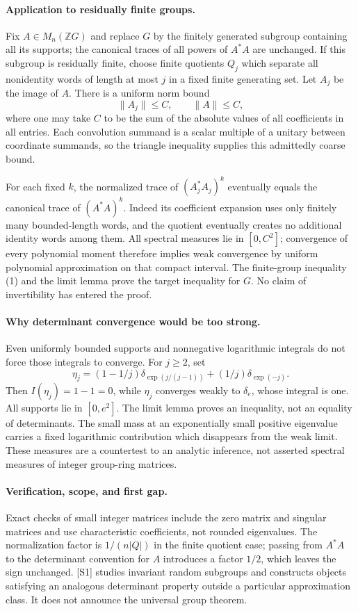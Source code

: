 \documentclass[11pt]{article}
\begin{document}
\paragraph{Application to residually finite groups.}
Fix $A\in M_n(\mathbb ZG)$ and replace $G$ by the finitely generated
subgroup containing all its supports; the canonical traces of all
powers of $A^*A$ are unchanged. If this subgroup is residually finite,
choose finite quotients $Q_j$ which separate all nonidentity words of
length at most $j$ in a fixed finite generating set. Let $A_j$ be the
image of $A$. There is a uniform norm bound
\[
 \|A_j\|\le C,\qquad\|A\|\le C,
\]
where one may take $C$ to be the sum of the absolute values of all
coefficients in all entries. Each convolution summand is a scalar
multiple of a unitary between coordinate summands, so the triangle
inequality supplies this admittedly coarse bound.

For each fixed $k$, the normalized trace of $(A_j^*A_j)^k$ eventually
equals the canonical trace of $(A^*A)^k$. Indeed its coefficient
expansion uses only finitely many bounded-length words, and the
quotient eventually creates no additional identity words among them.
All spectral measures lie in $[0,C^2]$; convergence of every polynomial
moment therefore implies weak convergence by uniform polynomial
approximation on that compact interval. The finite-group inequality
(1) and the limit lemma prove the target inequality for $G$. No
claim of invertibility has entered the proof.

\paragraph{Why determinant convergence would be too strong.}
Even uniformly bounded supports and nonnegative logarithmic integrals
do not force those integrals to converge. For $j\ge2$, set
\[
 \eta_j=(1-1/j)\delta_{\exp(j/(j-1))}
             +(1/j)\delta_{\exp(-j)}.
\]
Then $I(\eta_j)=1-1=0$, while $\eta_j$ converges weakly to
$\delta_e$, whose integral is one. All supports lie in $[0,e^2]$.
The limit lemma proves an inequality, not an equality of determinants.
The small mass at an exponentially small positive eigenvalue carries
a fixed logarithmic contribution which disappears from the weak limit.
These measures are a countertest to an analytic inference, not asserted
spectral measures of integer group-ring matrices.

\paragraph{Verification, scope, and first gap.}
Exact checks of small integer matrices include the zero matrix and
singular matrices and use characteristic coefficients, not rounded
eigenvalues. The normalization factor is $1/(n|Q|)$ in the finite
quotient case; passing from $A^*A$ to the determinant convention for
$A$ introduces a factor $1/2$, which leaves the sign unchanged.
[S1] studies invariant random subgroups and constructs objects
satisfying an analogous determinant property outside a particular
approximation class. It does not announce the universal group theorem.
\end{document}
